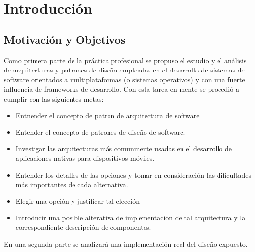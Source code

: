 
\chapter{Introducción} %

\label{Chapter1} %


\section{Motivación y Objetivos}
Como primera parte de la práctica profesional se propuso el estudio y el análisis de arquitecturas y patrones de diseño empleados en el desarrollo de sistemas de software orientados a multiplataformas (o sistemas operativos) y con una fuerte influencia de frameworks de desarrollo.
Con esta tarea en mente se procedió a cumplir con las siguientes metas:

\begin{itemize}
	\item Entnender el concepto de patron de arquitectura de software
	\item Entender el concepto de patrones de diseño de software.
	\item Investigar las arquitecturas más comunmente usadas en el desarrollo de aplicaciones nativas para dispositivos móviles.
	\item Entender los detalles de las opciones y tomar en consideración las dificultades más importantes de cada alternativa.
	\item Elegir una opción y justificar tal elección
	\item Introducir una posible alterativa de implementación de tal arquitectura y la correspondiente descripción de componentes.
	 
\end{itemize}

En una segunda parte se analizará una implementación real del diseño expuesto.

